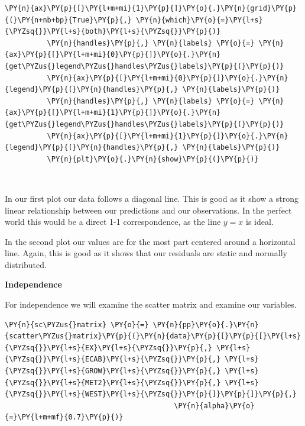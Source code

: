 \documentclass[10pt]{article}\usepackage[]{graphicx}\usepackage[]{xcolor}
\begin{document}
\begin{Verbatim}[commandchars=\\\{\}]
          \PY{n}{ax}\PY{p}{[}\PY{l+m+mi}{1}\PY{p}{]}\PY{o}{.}\PY{n}{grid}\PY{p}{(}\PY{n+nb+bp}{True}\PY{p}{,} \PY{n}{which}\PY{o}{=}\PY{l+s}{\PYZsq{}}\PY{l+s}{both}\PY{l+s}{\PYZsq{}}\PY{p}{)}
          \PY{n}{handles}\PY{p}{,} \PY{n}{labels} \PY{o}{=} \PY{n}{ax}\PY{p}{[}\PY{l+m+mi}{0}\PY{p}{]}\PY{o}{.}\PY{n}{get\PYZus{}legend\PYZus{}handles\PYZus{}labels}\PY{p}{(}\PY{p}{)}
          \PY{n}{ax}\PY{p}{[}\PY{l+m+mi}{0}\PY{p}{]}\PY{o}{.}\PY{n}{legend}\PY{p}{(}\PY{n}{handles}\PY{p}{,} \PY{n}{labels}\PY{p}{)}
          \PY{n}{handles}\PY{p}{,} \PY{n}{labels} \PY{o}{=} \PY{n}{ax}\PY{p}{[}\PY{l+m+mi}{1}\PY{p}{]}\PY{o}{.}\PY{n}{get\PYZus{}legend\PYZus{}handles\PYZus{}labels}\PY{p}{(}\PY{p}{)}
          \PY{n}{ax}\PY{p}{[}\PY{l+m+mi}{1}\PY{p}{]}\PY{o}{.}\PY{n}{legend}\PY{p}{(}\PY{n}{handles}\PY{p}{,} \PY{n}{labels}\PY{p}{)}
          \PY{n}{plt}\PY{o}{.}\PY{n}{show}\PY{p}{(}\PY{p}{)}
\end{Verbatim}

    \begin{center}
    \end{center}
    { \hspace*{\fill} \\}
    
    In our first plot our data follows a diagonal line. This is good as it
show a strong linear relationship between our predictions and our
observations. In the perfect world this would be a direct 1-1
correspondence, as the line $y=x$ is ideal.

In the second plot our values are for the most part centered around a
horizontal line. Again, this is good as it shows that our residuals are
static and normally distributed.

\textbf{Independence}

For independence we will examine the scatter matrix and examine our
variables.

    \begin{Verbatim}[commandchars=\\\{\}]
 \PY{n}{sc\PYZus{}matrix} \PY{o}{=} \PY{n}{pp}\PY{o}{.}\PY{n}{scatter\PYZus{}matrix}\PY{p}{(}\PY{n}{data}\PY{p}{[}\PY{p}{[}\PY{l+s}{\PYZsq{}}\PY{l+s}{EX}\PY{l+s}{\PYZsq{}}\PY{p}{,} \PY{l+s}{\PYZsq{}}\PY{l+s}{ECAB}\PY{l+s}{\PYZsq{}}\PY{p}{,} \PY{l+s}{\PYZsq{}}\PY{l+s}{GROW}\PY{l+s}{\PYZsq{}}\PY{p}{,} \PY{l+s}{\PYZsq{}}\PY{l+s}{MET2}\PY{l+s}{\PYZsq{}}\PY{p}{,} \PY{l+s}{\PYZsq{}}\PY{l+s}{WEST}\PY{l+s}{\PYZsq{}}\PY{p}{]}\PY{p}{]}\PY{p}{,}
                                        \PY{n}{alpha}\PY{o}{=}\PY{l+m+mf}{0.7}\PY{p}{)}
\end{Verbatim}
\end{document}
